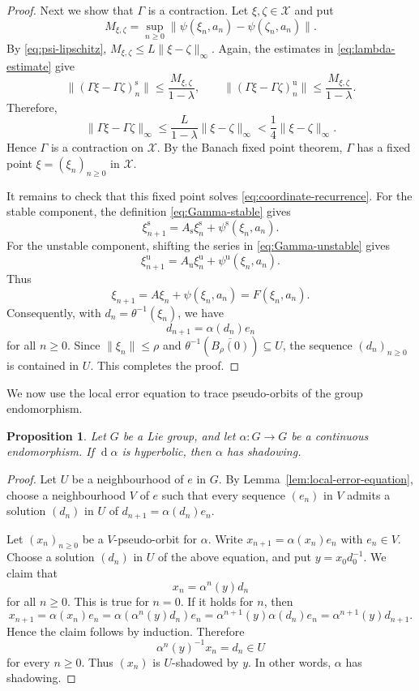 \documentclass[12pt]{amsart}
\newtheorem{proposition}[theorem]{Proposition}
\theoremstyle{definition}
\numberwithin{equation}{section}
\theoremstyle{remark}
\DeclareMathOperator{\di}{d}
\begin{document}
\begin{proof}
Next we show that $\Gamma$ is a contraction. Let $\xi,\zeta\in\mathcal X$
and put
\[
M_{\xi,\zeta}
=
\sup_{n\geq 0}
\|\psi(\xi_n,a_n)-\psi(\zeta_n,a_n)\|.
\]
By \eqref{eq:psi-lipschitz},
$M_{\xi,\zeta}\leq L\|\xi-\zeta\|_\infty$. Again, the estimates in \eqref{eq:lambda-estimate} give
\[
\|(\Gamma\xi-\Gamma\zeta)_n^{\mathrm{s}}\|
\leq
\frac{M_{\xi,\zeta}}{1-\lambda},
\qquad
\|(\Gamma\xi-\Gamma\zeta)_n^{\mathrm{u}}\|
\leq
\frac{M_{\xi,\zeta}}{1-\lambda}.
\]
Therefore,
\[
\|\Gamma\xi-\Gamma\zeta\|_\infty
\leq
\frac{L}{1-\lambda}\|\xi-\zeta\|_\infty
<
\frac14\|\xi-\zeta\|_\infty.
\]
Hence $\Gamma$ is a contraction on $\mathcal X$. By the Banach fixed point
theorem, $\Gamma$ has a fixed point $\xi=(\xi_n)_{n\geq 0}$ in $\mathcal X$.

It remains to check that this fixed point solves
\eqref{eq:coordinate-recurrence}. For the stable component, the definition
\eqref{eq:Gamma-stable} gives
\[
\xi_{n+1}^{\mathrm{s}}
=
A_{\mathrm{s}}\xi_n^{\mathrm{s}}
+
\psi^{\mathrm{s}}(\xi_n,a_n).
\]
For the unstable component, shifting the series in
\eqref{eq:Gamma-unstable} gives
\[
\xi_{n+1}^{\mathrm{u}}
=
A_{\mathrm{u}}\xi_n^{\mathrm{u}}
+
\psi^{\mathrm{u}}(\xi_n,a_n).
\]
Thus
\[
\xi_{n+1}=A\xi_n+\psi(\xi_n,a_n)=F(\xi_n,a_n).
\]
Consequently, with $d_n=\theta^{-1}(\xi_n)$, we have
\[
d_{n+1}=\alpha(d_n)e_n
\]
for all $n\geq 0$. Since $\|\xi_n\|\leq\rho$ and
$\theta^{-1}(\overline{B_\rho(0)})\subseteq U$, the sequence
$(d_n)_{n\geq 0}$ is
contained in $U$. This completes the proof.
\end{proof}

We now use the local error equation to trace pseudo-orbits of the group endomorphism.

\begin{proposition}\label{HypSha}
Let $G$ be a Lie group, and let $\alpha:G\to G$ be a continuous
endomorphism. If $\di \alpha$ is hyperbolic, then $\alpha$ has shadowing.
\end{proposition}

\begin{proof}
Let $U$ be a neighbourhood of $e$ in $G$. By Lemma~\ref{lem:local-error-equation},
choose a neighbourhood $V$ of $e$ such that every sequence $(e_n)$ in $V$
admits a solution $(d_n)$ in $U$ of
$
d_{n+1}=\alpha(d_n)e_n.
$

Let $(x_n)_{n\geq 0}$ be a $V$-pseudo-orbit for $\alpha$. Write
$
x_{n+1}=\alpha(x_n)e_n
$
with $e_n\in V$. Choose a solution $(d_n)$ in $U$ of the above 
equation, and put
$
y=x_0d_0^{-1}.
$
We claim that
\[
x_n=\alpha^n(y)d_n
\]
for all $n\geq 0$. This is true for $n=0$. If it holds for $n$, then
\[
x_{n+1}
=
\alpha(x_n)e_n
=
\alpha(\alpha^n(y)d_n)e_n
=
\alpha^{n+1}(y)\alpha(d_n)e_n
=
\alpha^{n+1}(y)d_{n+1}.
\]
Hence the claim follows by induction. Therefore
\[
\alpha^n(y)^{-1}x_n=d_n\in U
\]
for every $n\geq 0$. Thus $(x_n)$ is $U$-shadowed by $y$.
In other words, $\alpha$ has shadowing.
\end{proof}
\end{document}
